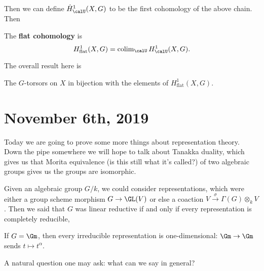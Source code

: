\documentclass[12pt]{article}
\begin{document}
Then we can define $\hat H_\calU^1(X,G)$ to be the first cohomology of the above chain. Then 
\begin{defn}
	The \textbf{flat cohomology} is 
	\[H^1_\text{flat}(X,G)=\operatorname{colim}_\calU H^1_\calU(X,G).\]
\end{defn}

The overall result here is 
\begin{thm}
	The $G$-torsors on $X$ in bijection with the elements of $H^1_\text{flat}(X,G)$.
\end{thm}

\section{November 6th, 2019}
Today we are going to prove some more things about representation theory. Down the pipe somewhere we will hope to talk about Tanakka duality, 
which gives us that Morita equivalence (is this still what it's called?) of two algebraic groups gives us the groups are isomorphic.

Given an algebraic group $G/k$, we could consider representations, which were either a group scheme morphism $G\to \GL(V)$ or else a coaction $V\xrightarrow{\sigma} \Gamma(G)\otimes_k V$.
Then we said that $G$ was linear reductive if and only if every representation is completely reducible,

\begin{ex}
	If $G=\Gm$, then every irreducible representation is one-dimensional: $\Gm\to\Gm$ sends $t\mapsto t^\alpha$.
\end{ex}
A natural question one may ask: what can we say in general?
\end{document}

